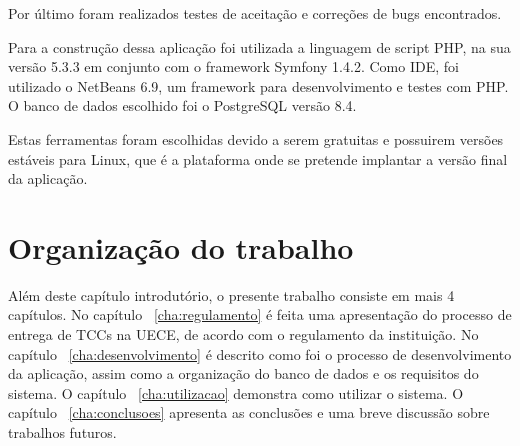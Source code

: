 Por último foram realizados testes de aceitação e correções de bugs encontrados.

Para a construção dessa aplicação foi utilizada a linguagem de script PHP, na 
sua versão 5.3.3 em conjunto com o framework Symfony 1.4.2. Como IDE, foi utilizado 
o NetBeans 6.9, um framework para desenvolvimento e testes com PHP. O 
banco de dados escolhido foi o PostgreSQL versão 8.4.

Estas ferramentas foram escolhidas devido a serem gratuitas e possuirem versões 
estáveis para Linux, que é a plataforma onde se pretende implantar a versão 
final da aplicação.

\section{Organização do trabalho}

Além deste capítulo introdutório, o presente trabalho consiste em mais 4 capítulos. 
No capítulo ~\ref{cha:regulamento} é feita uma apresentação do processo de entrega de TCCs na UECE, de acordo
com o regulamento da instituição. No capítulo ~\ref{cha:desenvolvimento} é descrito como foi o processo de desenvolvimento 
da aplicação, assim como a organização do banco de dados e os requisitos do sistema. 
O capítulo ~\ref{cha:utilizacao} demonstra como utilizar o sistema. O capítulo ~\ref{cha:conclusoes} apresenta as conclusões
e uma breve discussão sobre trabalhos futuros.


